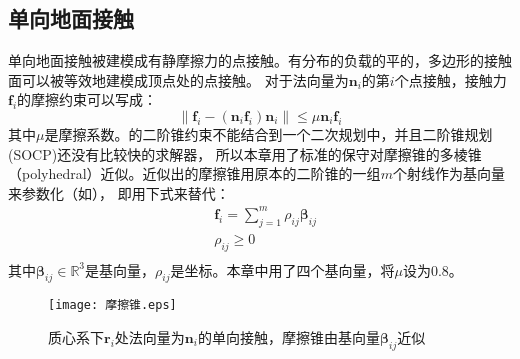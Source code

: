 \subsection{单向地面接触}
单向地面接触被建模成有静摩擦力的点接触。有分布的负载的平的，多边形的接触面可以被等效地建模成顶点处的点接触。
对于法向量为${{\boldsymbol{n}}_{i}}$的第$i$个点接触，接触力${{\boldsymbol{f}}_{i}}$的摩擦约束可以写成：
\begin{equation}
    \label{equ:friction_cone}
    \left\| {{\boldsymbol{f}}_{i}}-({{\boldsymbol{n}}_{i}}{{\boldsymbol{f}}_{i}}){{\boldsymbol{n}}_{i}} \right\|\le \mu {{\boldsymbol{n}}_{i}}{{\boldsymbol{f}}_{i}}
\end{equation}
其中$\mu$是摩擦系数。的二阶锥约束不能结合到一个二次规划中，并且二阶锥规划(SOCP)还没有比较快的求解器，
所以本章用了标准的保守对摩擦锥的多棱锥（polyhedral）近似。近似出的摩擦锥用原本的二阶锥的一组$m$个射线作为基向量来参数化（如），
即用下式来替代：
\begin{equation}
    \label{equ:friction_para}
    \begin{aligned}
        & {{\boldsymbol{f}}_{i}}=\sum\limits_{j=1}^{m}{{{\rho }_{ij}}{{\boldsymbol{\beta}}_{ij}}} \\ 
       & {{\rho }_{ij}}\ge 0 \\ 
      \end{aligned}      
\end{equation}
其中$\boldsymbol{\beta}_{ij} \in \mathbb{R}^3$是基向量，$\rho_{ij}$是坐标。本章中用了四个基向量，将$\mu$设为0.8。
\begin{figure}[htbp]
    \centering
    \texttt{[image: 摩擦锥.eps]}
    \caption{\label{fig:friction_cone}质心系下$\boldsymbol{r}_{i}$处法向量为${{\boldsymbol{n}}_{i}}$的单向接触，摩擦锥由基向量$\boldsymbol{\beta}_{ij}$近似}
\end{figure}
